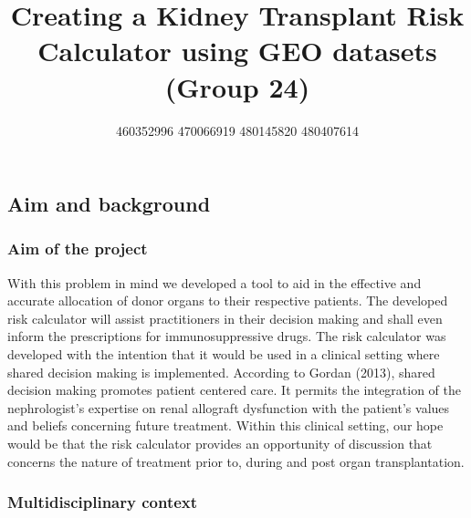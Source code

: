 \documentclass[a4paper,9pt,twocolumn,twoside,]{pinp}
\title{Creating a Kidney Transplant Risk Calculator using GEO datasets (Group
24)}
\author[]{460352996 470066919 480145820 480407614}
\affil[]{GitHub code repository is
\href{https://github.sydney.edu.au/aauw2900/DATA3888FinalProject}{here}}
\begin{document}
\verticaladjustment{-2pt}

\maketitle
\thispagestyle{firststyle}



\hypertarget{aim-and-background}{%
\subsection{Aim and background}\label{aim-and-background}}

\hypertarget{aim-of-the-project}{%
\subsubsection{Aim of the project}\label{aim-of-the-project}}

With this problem in mind we developed a tool to aid in the effective
and accurate allocation of donor organs to their respective patients.
The developed risk calculator will assist practitioners in their
decision making and shall even inform the prescriptions for
immunosuppressive drugs. The risk calculator was developed with the
intention that it would be used in a clinical setting where shared
decision making is implemented. According to Gordan (2013), shared
decision making promotes patient centered care. It permits the
integration of the nephrologist's expertise on renal allograft
dysfunction with the patient's values and beliefs concerning future
treatment. Within this clinical setting, our hope would be that the risk
calculator provides an opportunity of discussion that concerns the
nature of treatment prior to, during and post organ transplantation.

\hypertarget{multidisciplinary-context}{%
\subsubsection{Multidisciplinary
context}\label{multidisciplinary-context}}
\end{document}
